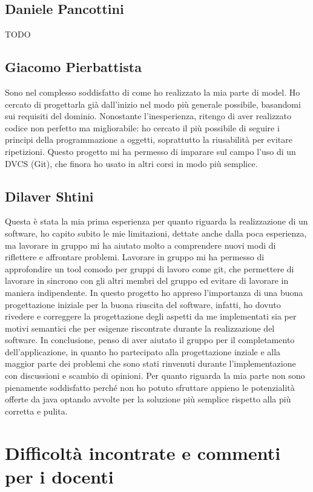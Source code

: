 \documentclass[a4paper,12pt]{report}
\begin{document}
\subsection*{Daniele Pancottini}
{TODO}

\subsection*{Giacomo Pierbattista}
Sono nel complesso soddisfatto di come ho realizzato la mia parte di model. Ho cercato di
progettarla già dall'inizio nel modo più generale possibile, basandomi sui requisiti del dominio.
Nonostante l'inesperienza, ritengo di aver realizzato codice non perfetto ma migliorabile:
ho cercato il più possibile di seguire i principi della programmazione a oggetti, soprattutto la riusabilità
per evitare ripetizioni.
Questo progetto mi ha permesso di imparare sul campo l'uso di un DVCS (Git), che finora ho usato
in altri corsi in modo più semplice.

\subsection*{Dilaver Shtini}
Questa è stata la mia prima esperienza per quanto riguarda la realizzazione di un software,
ho capito subito le mie limitazioni, dettate anche dalla poca esperienza, ma lavorare in gruppo
mi ha aiutato molto a comprendere nuovi modi di riflettere e affrontare problemi. Lavorare in gruppo
mi ha permesso di approfondire un tool comodo per gruppi di lavoro come git, che permettere di lavorare
in sincrono con gli altri membri del gruppo ed evitare di lavorare in maniera indipendente.
In questo progetto ho appreso l’importanza di una buona progettazione iniziale per la buona riuscita
del software, infatti, ho dovuto rivedere e correggere la progettazione degli aspetti da me implementati
sia per motivi semantici che per esigenze riscontrate durante la realizzazione del software.
In conclusione, penso di aver aiutato il gruppo per il completamento dell’applicazione,
in quanto ho partecipato alla progettazione inziale e alla maggior parte dei problemi che
sono stati rinvenuti durante l’implementazione con discussioni e scambio di opinioni.
Per quanto riguarda la mia parte non sono pienamente soddisfatto perché non ho potuto sfruttare appieno
le potenzialità offerte da java optando avvolte per la soluzione più semplice rispetto alla più corretta e pulita.


\section{Difficoltà incontrate e commenti per i docenti}
\end{document}
